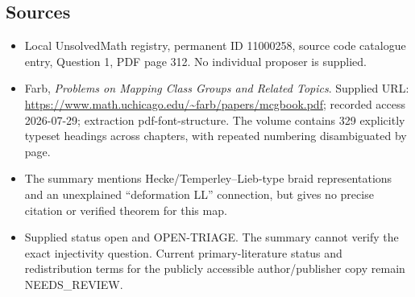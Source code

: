 \documentclass[11pt]{article}
\begin{document}
\subsection{Sources}
\begin{itemize}
\item Local UnsolvedMath registry, permanent ID 11000258, source code catalogue entry, Question 1, PDF page 312. No individual proposer is supplied.
\item Farb, \emph{Problems on Mapping Class Groups and Related Topics}. Supplied URL: \url{https://www.math.uchicago.edu/~farb/papers/mcgbook.pdf}; recorded access 2026-07-29; extraction pdf-font-structure. The volume contains 329 explicitly typeset headings across chapters, with repeated numbering disambiguated by page.
\item The summary mentions Hecke/Temperley--Lieb-type braid representations and an unexplained ``deformation LL'' connection, but gives no precise citation or verified theorem for this map.
\item Supplied status open and OPEN-TRIAGE. The summary cannot verify the exact injectivity question. Current primary-literature status and redistribution terms for the publicly accessible author/publisher copy remain NEEDS\_REVIEW.
\end{itemize}
\end{document}
